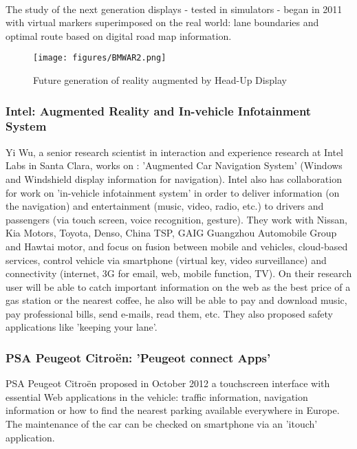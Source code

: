 \documentclass[a4paper]{article}
\begin{document}
\paragraph{}The study of the next generation displays - tested in simulators - began in 2011 \cite{BMWHUD2} with virtual markers superimposed on the real world: lane boundaries and optimal route based on digital road map information.
\begin{figure}[!htb]
\begin{center}
\texttt{[image: figures/BMWAR2.png]}
\caption{Future generation of reality augmented by Head-Up Display}
\end{center}
\end{figure}

\subsubsection{Intel: Augmented Reality and In-vehicle Infotainment System}

Yi Wu, a senior research scientist in interaction and experience research at Intel Labs in Santa Clara, works on \cite{Intel}: 'Augmented Car Navigation System' (Windows and Windshield display information for navigation). Intel also has collaboration for work on 'in-vehicle infotainment system' in order to deliver information (on the navigation) and entertainment (music, video, radio, etc.) to drivers and passengers (via touch screen, voice recognition, gesture). They work with Nissan, Kia Motors, Toyota, Denso, China TSP, GAIG Guangzhou Automobile Group and Hawtai motor, and focus on fusion between mobile and vehicles, cloud-based services, control vehicle via smartphone (virtual key, video surveillance) and connectivity (internet, 3G for email, web, mobile function, TV). On their research user will be able to catch important information on the web as the best price of a gas station or the nearest coffee, he also will be able to pay and download music, pay professional bills, send e-mails, read them, etc. They also proposed safety applications like 'keeping your lane'. 


\subsubsection{PSA Peugeot Citro\"en: 'Peugeot connect Apps'}

PSA Peugeot Citro\"en proposed in October 2012 \cite{PSA} a touchscreen interface with essential Web applications in the vehicle: traffic information, navigation information or how to find the nearest parking available everywhere in Europe. The maintenance of the car can be checked on smartphone via an 'itouch' application. 
\end{document}
